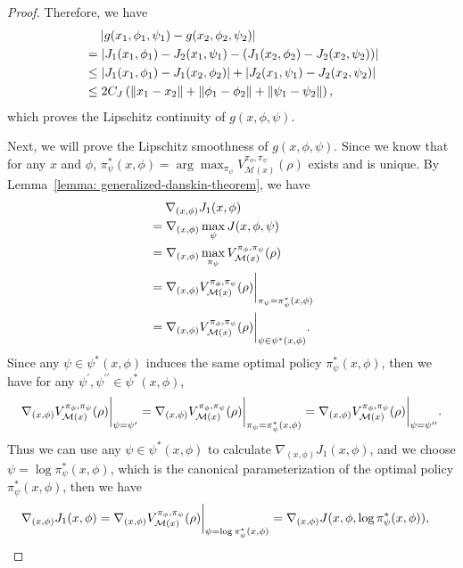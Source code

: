 \documentclass{article}
\theoremstyle{plain}
\theoremstyle{definition}
\theoremstyle{remark}
\def\cM{\mathcal M}
\begin{document}
\begin{proof}
    Therefore, we have
    \begin{align}
        & \quad \; |g(x_1,\phi_1,\psi_1) - g(x_2,\phi_2,\psi_2) | \notag \\
         & = |J_1(x_1,\phi_1) - J_2(x_1,\psi_1) - (J_1(x_2,\phi_2) - J_2(x_2,\psi_2))| \notag\\
        & \leq |J_1(x_1,\phi_1) - J_1(x_2,\phi_2)| + |J_2(x_1,\psi_1) - J_2(x_2,\psi_2)| \notag\\
        & \leq 2C_J \left( \| x_1 - x_2 \| + \|\phi_1 - \phi_2\| + \|\psi_1 - \psi_2\| \right) ,
    \end{align}
    which proves the Lipschitz continuity of $g(x,\phi,\psi)$.

    Next, we will prove the Lipschitz smoothness of $g(x,\phi,\psi)$.
    Since we know that for any $x$ and $\phi$, $\pi_\psi^*(x,\phi) = \arg\max_{\pi_\psi}V^{\pi_\phi,\pi_\psi}_{\cM(x)}(\rho)$  exists and is unique. By Lemma~\ref{lemma: generalized-danskin-theorem}, we have
    \begin{align}
        &\quad\;\nabla_{(x,\phi)} J_1(x,\phi) \notag\\
        & = \nabla_{(x,\phi)} \max_{\psi} J(x,\phi,\psi)\notag \\
        & = \nabla_{(x,\phi)} \max_{\pi_\psi} V^{\pi_\phi,\pi_\psi}_{\cM(x)}(\rho) \notag \\ 
        & = \nabla_{(x,\phi)} V^{\pi_\phi,\pi_\psi}_{\cM(x)}(\rho) \bigg|_{\pi_\psi = \pi_\psi^*(x,\phi)} \notag\\
        & = \nabla_{(x,\phi)} V^{\pi_\phi,\pi_\psi}_{\cM(x)}(\rho) \bigg|_{\psi \in \psi^*(x,\phi)} .\notag
    \end{align}
    Since any $\psi \in \psi^*(x,\phi)$ induces the same optimal policy $\pi_\psi^*(x,\phi)$, then we have for any $\psi^{\prime}, \psi^{\prime\prime} \in \psi^*(x,\phi)$,
    \begin{align}
         \nabla_{(x,\phi)} V^{\pi_\phi,\pi_\psi}_{\cM(x)}(\rho) \bigg|_{\psi = \psi^{\prime}}  =\nabla_{(x,\phi)} V^{\pi_\phi,\pi_\psi}_{\cM(x)}(\rho) \bigg|_{\pi_\psi = \pi_\psi^*(x,\phi)} =  \nabla_{(x,\phi)} V^{\pi_\phi,\pi_\psi}_{\cM(x)}(\rho) \bigg|_{\psi = \psi^{\prime\prime}}. \notag
    \end{align}
    Thus we can use any $\psi \in \psi^*(x,\phi)$ to calculate $\nabla_{(x,\phi)} J_1(x,\phi)$, and we choose $\psi = \log \pi_\psi^*(x,\phi)$, which is the canonical parameterization of the optimal policy $\pi_\psi^*(x,\phi)$, then we have
    \begin{align}
        \nabla_{(x,\phi)} J_1(x,\phi) & = \nabla_{(x,\phi)} V^{\pi_\phi,\pi_\psi}_{\cM(x)}(\rho) \bigg|_{\psi = \log \pi_\psi^*(x,\phi)} = \nabla_{(x,\phi)} J(x,\phi, \log \pi_\psi^*(x,\phi)) \notag ,

\end{align}
\end{proof}
\end{document}
